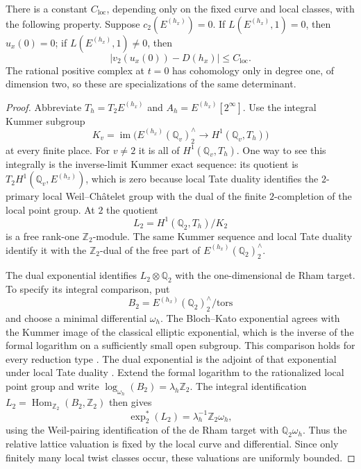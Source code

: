 \begin{proposition}\label{prop:cy:specialization}
There is a constant $C_{\mathrm{loc}}$, depending only on the fixed curve
and local classes, with the following property. Suppose
$c_2(E^{(h_x)})=0$. If $L(E^{(h_x)},1)=0$, then $u_x(0)=0$; if
$L(E^{(h_x)},1)\ne0$, then
\begin{equation}\label{eq:cy:determinant-center}
 \bigl|v_2(u_x(0))-D(h_x)\bigr|\leq C_{\mathrm{loc}}.
\end{equation}
The rational positive complex at $t=0$ has cohomology only in degree one,
of dimension two, so these are specializations of the same determinant.
\end{proposition}
\begin{proof}
Abbreviate $T_h=T_2E^{(h_x)}$ and $A_h=E^{(h_x)}[2^\infty]$.
Use the integral Kummer subgroup
\[
 K_v=\operatorname{im}\bigl(E^{(h_x)}(\mathbb Q _v)^{\wedge}_2
                              \longrightarrow H^1(\mathbb Q _v,T_h)\bigr)
\]
at every finite place.  For $v\ne2$ it is all of $H^1(\mathbb Q _v,T_h)$.
One way to see this integrally is the inverse-limit Kummer exact sequence:
its quotient is $T_2H^1(\mathbb Q _v,E^{(h_x)})$, which is zero because
local Tate duality identifies the $2$-primary local Weil--Ch\^atelet group
with the dual of the finite $2$-completion of the local point group.
At $2$ the quotient
\[
 L_2=H^1(\mathbb Q _2,T_h)/K_2
\]
is a free rank-one $\mathbb Z _2$-module.  The same Kummer sequence and
local Tate duality identify it with the $\mathbb Z _2$-dual of the free
part of $E^{(h_x)}(\mathbb Q _2)^{\wedge}_2$.

The dual exponential identifies $L_2\otimes\mathbb Q _2$ with the
one-dimensional de Rham target. To specify its integral comparison, put
\[
 B_2=E^{(h_x)}(\mathbb Q _2)^{\wedge}_2/\mathrm{tors}
\]
and choose a minimal differential $\omega_h$.
The Bloch--Kato exponential agrees with the Kummer image of the classical
elliptic exponential, which is the inverse of the formal logarithm on a
sufficiently small open subgroup. This comparison holds for every
reduction type \cite[Definition~3.10 and Example~3.11]{BlochKato1990}.
The dual exponential is the adjoint of that exponential under local
Tate duality \cite[\S II and Proposition~II.5]{Berger2003}.
Extend the formal logarithm to the rationalized local point group and write
$\log_{\omega_h}(B_2)=\lambda_h\mathbb Z _2$.
The integral identification
$L_2=\operatorname{Hom}_{\mathbb Z _2}(B_2,\mathbb Z _2)$ then gives
\[
 \exp_2^*(L_2)=\lambda_h^{-1}\mathbb Z _2\omega_h,
\]
using the Weil-pairing identification of the de Rham target with
$\mathbb Q _2\omega_h$. Thus the relative lattice valuation is fixed
by the local curve and differential. Since only finitely many local
twist classes occur, these valuations are uniformly bounded.


\end{proof}
